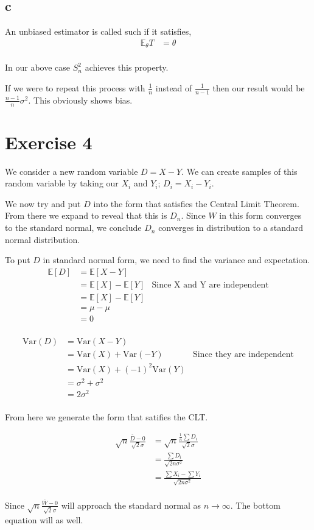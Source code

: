 \documentclass{article}
\newcommand{\expect}{\mathbb{E}}
\newcommand{\var}{\text{Var}}
\begin{document}
\subsection{c}
An unbiased estimator is called such if it satisfies,
\begin{align*}
    \expect_\theta T &= \theta \\
\end{align*}

In our above case $S_n^2$ achieves this property.

If we were to repeat this process with $\frac{1}{n}$ instead of $\frac{1}{n-1}$
then our result would be $\frac{n-1}{n} \sigma^2$. This obviously shows
bias.

\section{Exercise 4}
We consider a new random variable $D = X - Y$. We can create samples of this
random variable by taking our $X_i$ and $Y_i$; $D_i = X_i - Y_i$.

We now try and put $D$ into the form that satisfies the Central Limit Theorem.
From there we expand to reveal that this is $D_n$. Since $W$ in this form
converges to the standard normal, we conclude $D_n$ converges in distribution
to a standard normal distribution.

To put $D$ in standard normal form, we need to find the variance and expectation.
\begin{align*}
    \expect [D] &= \expect [X - Y] \\
    &= \expect [X] - \expect [Y] & \text{Since X and Y are independent} \\
    &= \expect [X] - \expect [Y] \\
    &= \mu - \mu \\
    &= 0 \\
\end{align*}

\begin{align*}
    \var (D) &= \var (X - Y) \\
    &= \var (X)+ \var(-Y) & \text{Since they are independent} \\
    &= \var (X)+ {(-1)}^2 \var(Y) \\
    &= \sigma^2 + \sigma^2 \\
    &= 2 \sigma^2 \\
\end{align*}

From here we generate the form that satifies the CLT\@.

\begin{align*}
    \sqrt{n} \frac{\bar{D} - 0}{\sqrt{2} \sigma}
    &= \sqrt{n} \frac{\frac{1}{n}\sum D_i}{\sqrt{2} \sigma} \\
    &= \frac{\sum D_i}{\sqrt{2n\sigma^2}} \\
    &= \frac{\sum X_i - \sum Y_i}{\sqrt{2n\sigma^2}} \\
\end{align*}

Since $\sqrt{n} \frac{\bar{W} - 0}{\sqrt{2} \sigma}$ will approach the standard
normal as $n \to \infty$. The bottom equation will as well.
\end{document}
